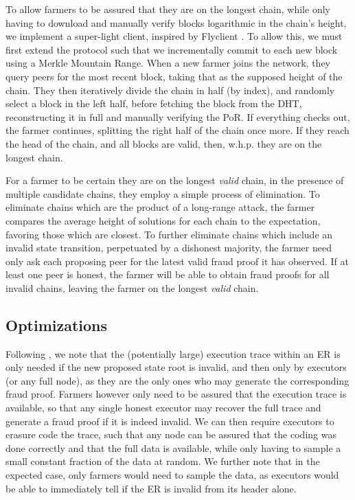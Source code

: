 \documentclass[conference]{IEEEtran}
\begin{document}
To allow farmers to be assured that they are on the longest chain, while only having to download and manually verify blocks logarithmic in the chain’s height, we implement a super-light client, inspired by Flyclient \cite{bunz2020flyclient}. To allow this, we must first extend the protocol such that we incrementally commit to each new block using a Merkle Mountain Range. When a new farmer joins the network, they query peers for the most recent block, taking that as the supposed height of the chain. They then iteratively divide the chain in half (by index), and randomly select a block in the left half, before fetching the block from the DHT, reconstructing it in full and manually verifying the PoR. If everything checks out, the farmer continues, splitting the right half of the chain once more. If they reach the head of the chain, and all blocks are valid, then, w.h.p. they are on the longest chain. 

For a farmer to be certain they are on the longest \textit{valid} chain, in the presence of multiple candidate chains, they employ a simple process of elimination. To eliminate chains which are the product of a long-range attack, the farmer compares the average height of solutions for each chain to the expectation, favoring those which are closest. To further eliminate chains which include an invalid state transition, perpetuated by a dishonest majority, the farmer need only ask each proposing peer for the latest valid fraud proof it has observed. If at least one peer is honest, the farmer will be able to obtain fraud proofs for all invalid chains, leaving the farmer on the longest \textit{valid} chain. 

\subsection{Optimizations}

Following \cite{al2018fraud}, we note that the (potentially large) execution trace within an ER is only needed if the new proposed state root is invalid, and then only by executors (or any full node), as they are the only ones who may generate the corresponding fraud proof. Farmers however only need to be assured that the execution trace is available, so that any single honest executor may recover the full trace and generate a fraud proof if it is indeed invalid. We can then require executors to erasure code the trace, such that any node can be assured that the coding was done correctly and that the full data is available, while only having to sample a small constant fraction of the data at random. We further note that in the expected case, only farmers would need to sample the data, as executors would be able to immediately tell if the ER is invalid from its header alone. 
\end{document}
